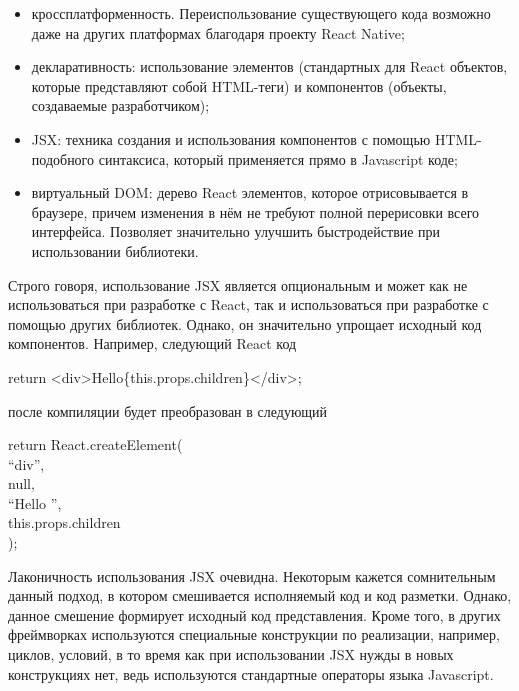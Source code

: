 \begin{itemize}
  \item кроссплатформенность. Переиспользование существующего кода возможно даже на других платформах
  благодаря проекту React Native;
  \item декларативность: использование элементов (стандартных для React объектов, которые представляют собой HTML-теги)
  и компонентов (объекты, создаваемые разработчиком);
  \item JSX: техника создания и использования компонентов с помощью HTML-подобного синтаксиса, который применяется
  прямо в Javascript коде;
  \item виртуальный DOM: дерево React элементов, которое отрисовывается в браузере, причем изменения в нём не требуют
  полной перерисовки всего интерфейса. Позволяет значительно улучшить быстродействие при использовании библиотеки.
\end{itemize}

Строго говоря, использование JSX является опциональным и может как не использоваться при разработке с React, так и
использоваться при разработке с помощью других библиотек. Однако, он значительно упрощает исходный код компонентов.
Например, следующий React код

\begin{flushleft}
  \qquad\qquad\qquad return <div>Hello\{this.props.children\}</div>;
  \end{flushleft}
  после компиляции будет преобразован в следующий
  \begin{flushleft}
  \qquad\qquad\qquad return React.createElement(\\
  \qquad\qquad\qquad\qquad ``div'',\\
  \qquad\qquad\qquad\qquad null,\\
  \qquad\qquad\qquad\qquad ``Hello '',\\
  \qquad\qquad\qquad\qquad this.props.children\\
  \qquad\qquad\qquad );
\end{flushleft}

Лаконичность использования JSX очевидна. Некоторым кажется сомнительным данный подход, в котором смешивается
исполняемый код и код разметки. Однако, данное смешение формирует исходный код представления. Кроме того, в других
фреймворках используются специальные конструкции по реализации, например, циклов, условий, в то время как при
использовании JSX нужды в новых конструкциях нет, ведь используются стандартные операторы языка Javascript.

